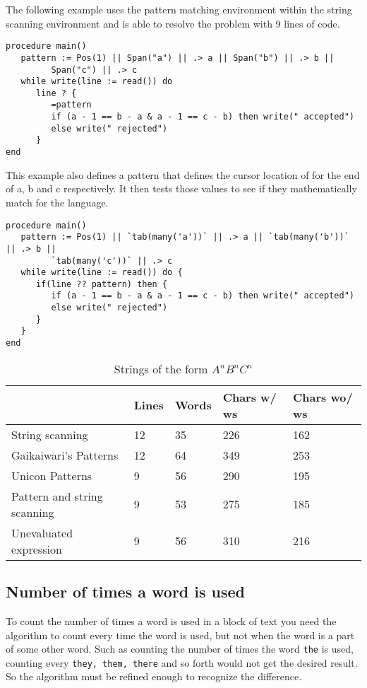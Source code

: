 \documentclass{article}
\begin{document}
The following example uses the pattern matching environment within the string scanning environment and is able to resolve the problem with 9 lines of code.
\begin{verbatim}
procedure main()
   pattern := Pos(1) || Span("a") || .> a || Span("b") || .> b ||
         Span("c") || .> c 
   while write(line := read()) do
      line ? {
         =pattern
         if (a - 1 == b - a & a - 1 == c - b) then write(" accepted")
         else write(" rejected")
      }
end
\end{verbatim}
This example also defines a pattern that defines the cursor location of for the end of a, b and c respectively.  It then tests those values to see if they mathematically match for the language.

\begin{verbatim}
procedure main()
   pattern := Pos(1) || `tab(many('a'))` || .> a || `tab(many('b'))` || .> b ||
         `tab(many('c'))` || .> c
   while write(line := read()) do {
      if(line ?? pattern) then {
         if (a - 1 == b - a & a - 1 == c - b) then write(" accepted")
         else write(" rejected")
      }
   }
end
\end{verbatim}

\begin{table}[ht]
	\caption{Strings of the form \emph{$A^nB^nC^n$}}
	\centering
	\begin{tabular}{|l|l|l|l|l|}
		\hline\hline
		 & Lines & Words & Chars w/ ws & Chars wo/ ws\\
		\hline
		String scanning & 12 & 35 & 226 & 162 \\
		Gaikaiwari's Patterns & 12 & 64 & 349 & 253 \\
		Unicon Patterns & 9 & 56 & 290 & 195 \\
		Pattern and string scanning & 9 & 53 & 275 & 185 \\
		Unevaluated expression & 9 & 56 & 310 & 216 \\
		\hline
	\end{tabular}
\end{table}

\subsection{Number of times a word is used}
To count the number of times a word is used in a block of text you need the algorithm to count every time the word is used, but not when the word is a part of some other word.  Such as counting the number of times the word \texttt{the} is used, counting every \texttt{they, them, there} and so forth would not get the desired result.  So the algorithm must be refined enough to recognize the difference.
\end{document}
